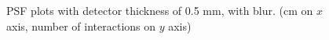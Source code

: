 \documentclass[a4paper]{article}
\begin{document}
\begin{figure}[H]
  \caption{PSF plots with detector thickness of 0.5 mm, with blur. (cm on $x$ axis, number of interactions on $y$ axis)}
  \label{fig:005_xse}
\end{figure}
\end{document}
